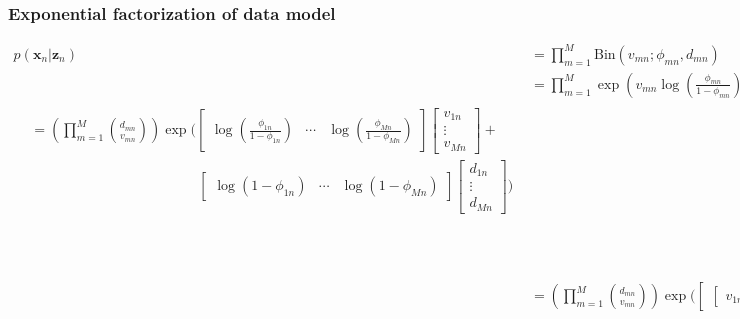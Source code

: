 \documentclass[11pt]{article}
\newcommand{\bx}{\ensuremath{\mathbf{x}}}
\newcommand{\bz}{\ensuremath{\mathbf{z}}}
\begin{document}
\subsubsection{Exponential factorization of data model}
\vspace{-0.5cm}
\begin{align}
p(\bx_n | \bz_n) &= \prod\limits_{m=1}^M \mathrm{Bin}(v_{mn}; \phi_{mn}, d_{mn}) \nonumber \\
				 &= \prod\limits_{m=1}^M \exp\left(v_{mn} \log\left(\frac{\phi_{mn}}{1 - \phi_{mn}}\right) + (d_{mn} - v_{mn}) \log(1 - \phi_{mn}) \right) \nonumber \\				 		
\begin{split}
				&=\left( \prod\limits_{m=1}^M \binom{d_{mn}}{v_{mn}} \right)
				\exp\bigg( 
\begin{bmatrix}
         \log\left(\frac{\phi_{1n}}{1 - \phi_{1n}}\right) & \cdots & \log\left(\frac{\phi_{Mn}}{1 - \phi_{Mn}}\right)
        \end{bmatrix}\begin{bmatrix}
         v_{1n} \\ \vdots \\ v_{Mn}
        \end{bmatrix}  + \\
& \qquad \qquad\qquad\qquad\qquad\qquad \begin{bmatrix}
         \log\left(1 - \phi_{1n}\right) & \cdots & \log\left(1 - \phi_{Mn}\right)
        \end{bmatrix}      
                \begin{bmatrix}
         d_{1n} \\ \vdots \\ d_{Mn}
        \end{bmatrix} 
        \bigg)
        \end{split} \\
&=    \left( \prod\limits_{m=1}^M \binom{d_{mn}}{v_{mn}} \right)
			 \exp\bigg(
			\begin{bmatrix}
				\begin{bmatrix}
				 v_{1n} &  d_{1n}
				\end{bmatrix} & \cdots &
				\begin{bmatrix}
				 v_{Mn} &  d_{Mn}
				\end{bmatrix}
			\end{bmatrix}
			\begin{bmatrix}
				\begin{bmatrix}
					\log\left(1 - \phi_{1n}\right) \\ \log\left(\frac{\phi_{1n}}{1 - \phi_{1n}}\right)
				\end{bmatrix} \\
				\vdots \\
				\begin{bmatrix}
					\log\left(1 - \phi_{Mn}\right) \\ \log\left(\frac{\phi_{Mn}}{1 - \phi_{Mn}}\right)
				\end{bmatrix}
			\end{bmatrix} \\
\end{align}
\end{document}
